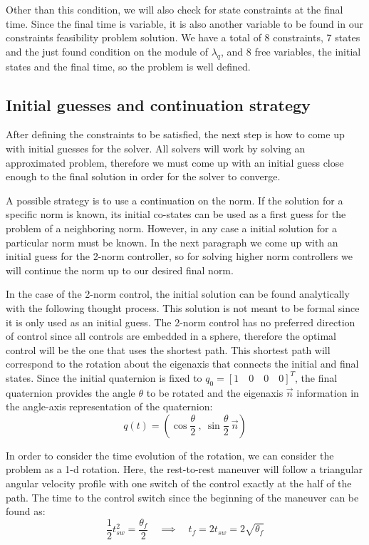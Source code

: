 Other than this condition, we will also check for state constraints at the final time. Since the final time is variable, it is also another variable to be found in our constraints feasibility problem solution. We have a total of 8 constraints, 7 states and the just found condition on the module of $\lambda_q$, and 8 free variables, the initial states and the final time, so the problem is well defined.

\subsection{Initial guesses and continuation strategy}
After defining the constraints to be satisfied, the next step is how to come up with initial guesses for the solver. All solvers will work by solving an approximated problem, therefore we must come up with an initial guess close enough to the final solution in order for the solver to converge.

A possible strategy is to use a continuation on the norm. If the solution for a specific norm is known, its initial co-states can be used as a first guess for the problem of a neighboring norm. However, in any case a initial solution for a particular norm must be known. In the next paragraph we come up with an initial guess for the 2-norm controller, so for solving higher norm controllers we will continue the norm up to our desired final norm.

In the case of the 2-norm control, the initial solution can be found analytically with the following thought process. This solution is not meant to be formal since it is only used as an initial guess. The 2-norm control has no preferred direction of control since all controls are embedded in a sphere, therefore the optimal control will be the one that uses the shortest path. This shortest path will correspond to the rotation about the eigenaxis that connects the initial and final states. Since the initial quaternion is fixed to $q_0=[1 \quad 0 \quad 0 \quad 0]^T$, the final quaternion provides the angle $\theta$ to be rotated and the eigenaxis $\vec{n}$ information in the angle-axis representation of the quaternion:
\begin{equation}
q(t) = \left( \cos \frac{\theta}{2} \ ,\ \sin\frac{\theta}{2} \ \vec{n} \right)
\end{equation}

In order to consider the time evolution of the rotation, we can consider the problem as a 1-d rotation. Here, the rest-to-rest maneuver will follow a triangular angular velocity profile with one switch of the control exactly at the half of the path. The time to the control switch since the beginning of the maneuver can be found as:
\begin{equation}
  \frac{1}{2} t_{sw}^2 = \frac{\theta_f}{2} \quad \implies \quad t_f=2 t_{sw} = 2 \sqrt{\theta_f}
\end{equation}

